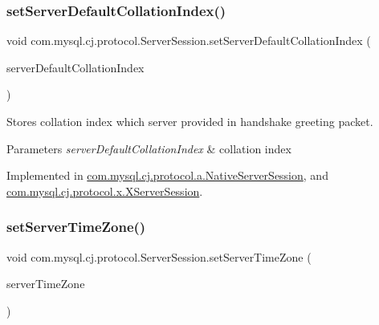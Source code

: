 \mbox{\label{interfacecom_1_1mysql_1_1cj_1_1protocol_1_1_server_session_aa712ac71a0771a45a3f8b46ceaac4178}} 
\subsubsection{\texorpdfstring{set\+Server\+Default\+Collation\+Index()}{setServerDefaultCollationIndex()}}
{\footnotesize\ttfamily void com.\+mysql.\+cj.\+protocol.\+Server\+Session.\+set\+Server\+Default\+Collation\+Index (\begin{DoxyParamCaption}\item[{int}]{server\+Default\+Collation\+Index }\end{DoxyParamCaption})}

Stores collation index which server provided in handshake greeting packet.


\begin{DoxyParams}{Parameters}
{\em server\+Default\+Collation\+Index} & collation index \\
\hline
\end{DoxyParams}


Implemented in \mbox{\hyperlink{classcom_1_1mysql_1_1cj_1_1protocol_1_1a_1_1_native_server_session_abd6266538f2562073361edbc958a3304}{com.\+mysql.\+cj.\+protocol.\+a.\+Native\+Server\+Session}}, and \mbox{\hyperlink{classcom_1_1mysql_1_1cj_1_1protocol_1_1x_1_1_x_server_session_a2356570d8139fdbd022d253859128cd4}{com.\+mysql.\+cj.\+protocol.\+x.\+X\+Server\+Session}}.

\mbox{\label{interfacecom_1_1mysql_1_1cj_1_1protocol_1_1_server_session_a0278632316cb6f88139c404062beb68e}} 
\subsubsection{\texorpdfstring{set\+Server\+Time\+Zone()}{setServerTimeZone()}}
{\footnotesize\ttfamily void com.\+mysql.\+cj.\+protocol.\+Server\+Session.\+set\+Server\+Time\+Zone (\begin{DoxyParamCaption}\item[{Time\+Zone}]{server\+Time\+Zone }\end{DoxyParamCaption})}



